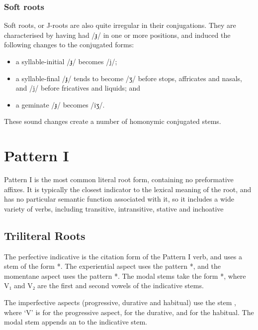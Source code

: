 \documentclass[grammar]{subfiles}
\begin{document}
\subsubsection{Soft roots}
\label{sssec:vm_soft_roots}

Soft roots, or J-roots are also quite irregular in their conjugations. They are
characterised by having had /ɟ/ in one or more positions, and induced the
following changes to the conjugated forms: 

\begin{itemize}
  \item a syllable-initial /ɟ/ becomes /j/; 
  \item a syllable-final /ɟ/ tends to become /ʒ/ before stops, affricates and
    nasals, and /j/ before fricatives and liquids; and
  \item a geminate /ɟ/ becomes /iʒ/. 
\end{itemize}

These sound changes create a number of homonymic conjugated stems. 


\section{Pattern I}
\label{sec:vm_verb_pattern_i}

Pattern I is the most common literal root form, containing no preformative
affixes.  It is typically the closest indicator to the lexical meaning of the
root, and has no particular semantic function associated with it, so it
includes a wide variety of verbs, including transitive, intransitive, stative
and inchoative


\subsection{Triliteral Roots}
\label{ssec:vm_i_triliteral}
%
%

The perfective indicative is the citation form of the Pattern I verb, and uses
a stem of the form *.  The experiential aspect uses the pattern
*, and the momentane aspect uses the pattern *.  The
modal stems take the form *, where V₁ and V₂ are the first and
second vowels of the indicative stems. 

The imperfective aspects (progressive, durative and  habitual) use the stem
, where ‘V’ is  for the progressive aspect,
 for the durative, and  for the habitual.  The modal stem
appends an  to the indicative stem. 
\end{document}
